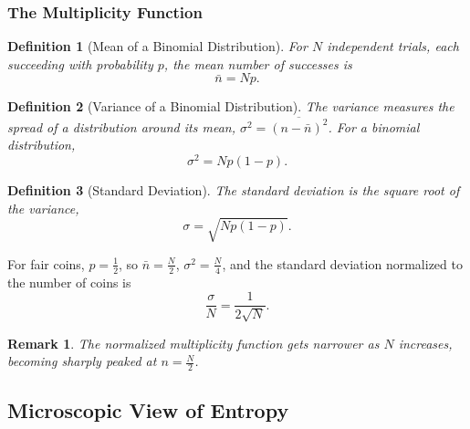 \documentclass{article}
\newtheorem{definition}{Definition}
\newtheorem{remark}{Remark}
\begin{document}
\subsubsection{The Multiplicity Function}
\begin{definition}[Mean of a Binomial Distribution]
    For $N$ independent trials, each succeeding with probability $p$, the mean number of successes is
    \[\bar{n} = Np.\]
\end{definition}
\begin{definition}[Variance of a Binomial Distribution]
    The variance measures the spread of a distribution around its mean, $\sigma^2 = \overline{(n - \bar{n})^2}$. For a binomial distribution,
    \[\sigma^2 = Np(1-p).\]
\end{definition}
\begin{definition}[Standard Deviation]
    The standard deviation is the square root of the variance,
    \[\sigma = \sqrt{Np(1-p)}.\]
\end{definition}
For fair coins, $p = \frac{1}{2}$, so $\bar{n} = \frac{N}{2}$, $\sigma^2 = \frac{N}{4}$, and the standard deviation normalized to the number of coins is
\[\frac{\sigma}{N} = \frac{1}{2\sqrt{N}}.\]
\begin{remark}
    The normalized multiplicity function gets narrower as $N$ increases, becoming sharply peaked at $n = \frac{N}{2}$.
\end{remark}

\subsection{Microscopic View of Entropy}
\end{document}
